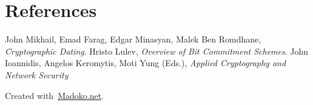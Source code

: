 \documentclass{article}
\begin{document}
\section*{References}\label{sec-references}%

\noindent{}John Mikhail, Emad Farag, Edgar Minasyan, Malek Ben Romdhane, \emph{Cryptographic Dating}.\mdbr
{}Hristo Lulev, \emph{Overview of Bit Commitment Schemes}.\mdbr
{}John Ioannidis, Angelos Keromytis, Moti Yung (Eds.), \emph{Applied Cryptography and Network Security}%

\begin{mdbmargintb}{4em}{}%
\begin{mdflushright}%
{\tiny{}Created with~\href{https://www.madoko.net}{Madoko.net}.}%
\end{mdflushright}%
\end{mdbmargintb}%
\end{document}
